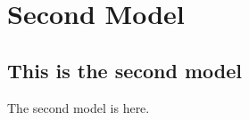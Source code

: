 %
%
\chapter{Second Model }\label{chap:3}
\hskip 0.5in

\section{This is the second model}

The second model is here. 

